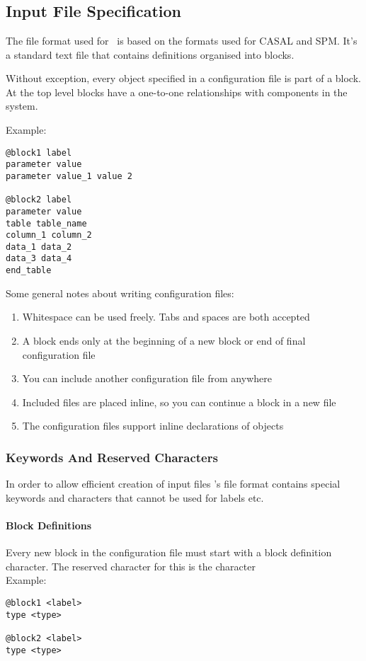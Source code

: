 
\section{\label{sec:examples}}

\subsection{Input File Specification}
The file format used for \CNAME\ is based on the formats used for CASAL and SPM. It's a standard text file that contains definitions organised into blocks.

Without exception, every object specified in a configuration file is part of a block. At the top level blocks have a one-to-one relationships with components in the system.

Example:
{\small{\begin{verbatim}
@block1 label
parameter value
parameter value_1 value 2

@block2 label
parameter value
table table_name
column_1 column_2
data_1 data_2
data_3 data_4
end_table
\end{verbatim}}}

Some general notes about writing configuration files:

\begin{enumerate}
	\item Whitespace can be used freely. Tabs and spaces are both accepted
	\item A block ends only at the beginning of a new block or end of final configuration file
	\item You can include another configuration file from anywhere
	\item Included files are placed inline, so you can continue a block in a new file
	\item The configuration files support inline declarations of objects
\end{enumerate}

\subsubsection{Keywords And Reserved Characters}
In order to allow efficient creation of input files \CNAME's file format contains special keywords and characters that cannot be used for labels etc.

\paragraph*{\command Block Definitions}
Every new block in the configuration file must start with a block definition character. The reserved character for this is the \command character\\
Example:
{\small{\begin{verbatim}
@block1 <label>
type <type>

@block2 <label>
type <type>
\end{verbatim}}}

